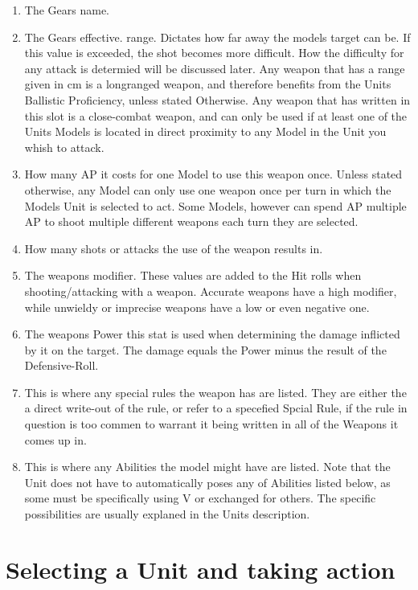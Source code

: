 \documentclass[a4paper,14pt]{book}
\begin{document}
\begin{adjustwidth}{-3cm}{-3cm}
\begin{multicols}{2}
\begin{enumerate}
	\item The Gears name.
	\item The Gears effective. range. Dictates how far away the models target can be. If this value is  exceeded, the shot becomes more difficult. How the difficulty for any attack is determied will be discussed later. Any weapon that has a range given in cm is a longranged weapon, and therefore benefits from the Units Ballistic Proficiency, unless stated Otherwise. Any weapon that has  written in this slot is a close-combat weapon, and can only be used if at least one of the Units Models is located in direct proximity to any Model in the Unit you whish to attack.
	\item How many AP it costs for one Model to use this weapon once. Unless stated otherwise, any Model can only use one weapon once per turn in which the Models Unit is selected to act. Some Models, however can spend AP multiple AP to shoot multiple different weapons each turn they are selected.
	\item How many shots or attacks the use of the weapon results in.
	\item The weapons modifier. These values are added to the Hit rolls when shooting/attacking with a weapon. Accurate weapons have a high modifier, while unwieldy or imprecise weapons have a low or even negative one.
	\item The weapons Power this stat is used when determining the damage inflicted by it on the target. The damage equals the Power minus the result of the Defensive-Roll.
	\item This is where any special rules the weapon has are listed. They are either the a direct write-out of the rule, or refer to a specefied Spcial Rule, if the rule in question is too commen to warrant it being written in all of the Weapons it comes up in.
	\item This is where any Abilities the model might have are listed. Note that the Unit does not have to automatically poses any of Abilities listed below, as some must be specifically  using V or exchanged for others. The specific possibilities are usually explaned in the Units description.
	
\end{enumerate}
\end{multicols}
\end{adjustwidth}



\section{Selecting a Unit and taking action}
\end{document}
